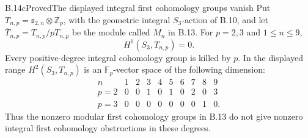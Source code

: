 \begin{statement}{B.14c}{Proved}{The displayed integral first cohomology groups vanish}
Put $T_{n,p}=\mathfrak s_{2,n}\otimes\mathbb Z_p$, with the
geometric integral $S_3$-action of B.10, and let
$\overline T_{n,p}=T_{n,p}/pT_{n,p}$ be the module called
$M_n$ in B.13. For $p=2,3$ and $1\leq n\leq9$,
\[
 H^1(S_3,T_{n,p})=0.
\]
Every positive-degree integral cohomology group is killed
by $p$. In the displayed range $H^2(S_3,T_{n,p})$ is an
$\mathbb F_p$-vector space of the following dimension:
\[
\begin{array}{c|rrrrrrrrr}
n&1&2&3&4&5&6&7&8&9\\\hline
p=2&0&0&1&0&1&0&2&0&3\\
p=3&0&0&0&0&0&0&0&1&0.
\end{array}
\]
Thus the nonzero modular first cohomology groups in B.13
do not give nonzero integral first cohomology obstructions
in these degrees.
\end{statement}
